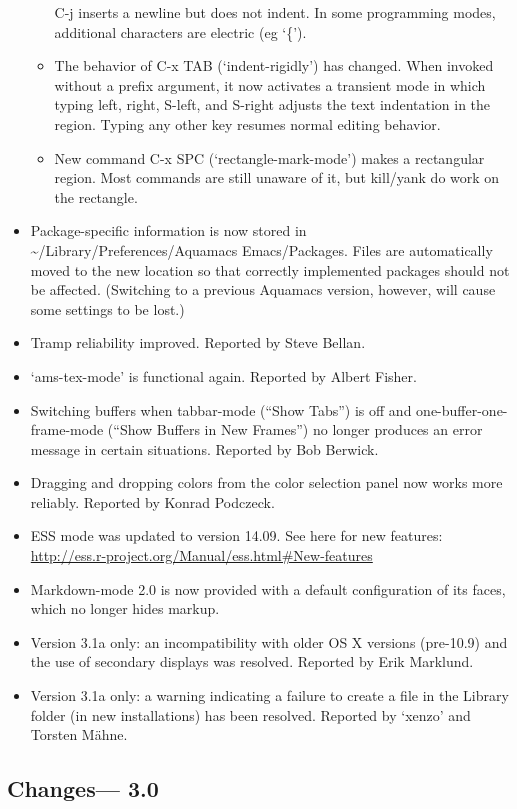 \begin{itemize}
\begin{itemize}
C-j inserts a newline but does not indent.  In some programming modes,
additional characters are electric (eg `\{').
\item The behavior of C-x TAB (`indent-rigidly') has changed.
When invoked without a prefix argument, it now activates a transient
mode in which typing left, right, S-left, and S-right adjusts
the text indentation in the region.  Typing any other key resumes
normal editing behavior.
\item New command C-x SPC (`rectangle-mark-mode') makes a rectangular region.
Most commands are still unaware of it, but kill/yank do work on the rectangle.
\end{itemize}
\item Package-specific information is now stored in {\textasciitilde{}}/Library/Preferences/Aquamacs Emacs/Packages.  Files are automatically moved to the new location so that correctly implemented packages should not be affected.  (Switching to a previous Aquamacs version, however, will cause some settings to be lost.)
\item Tramp reliability improved.
Reported by Steve Bellan. 
\item `ams-tex-mode' is functional again.
Reported by Albert Fisher. 
\item Switching buffers when tabbar-mode (``Show Tabs'') is off and one-buffer-one-frame-mode (``Show Buffers in New Frames'') no longer produces an error message in certain situations. 
Reported by Bob Berwick.
\item Dragging and dropping colors from the color selection panel now works more reliably.
Reported by Konrad Podczeck.
\item ESS mode was updated to version 14.09. See here for new features: \url{http://ess.r-project.org/Manual/ess.html#New-features}
\item Markdown-mode 2.0 is now provided with a default configuration of its faces, which no longer hides markup.
\item Version 3.1a only: an incompatibility with older OS X versions (pre-10.9) and the use of secondary displays was resolved.
Reported by Erik Marklund.
\item Version 3.1a only: a warning indicating a failure to create a file in the Library folder (in new installations) has been resolved.
Reported by `xenzo' and Torsten M\"ahne.
\end{itemize}

\subsection{Changes--- 3.0}


